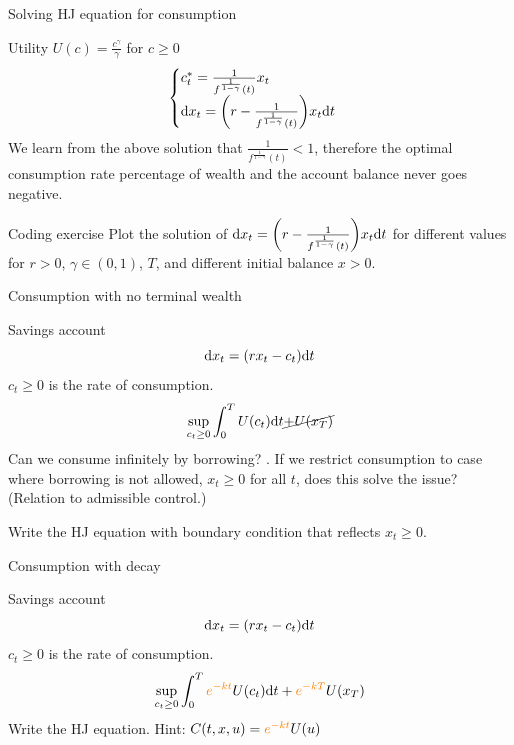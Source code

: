 \documentclass[color=usenames,dvipsnames]{beamer}
\newcommand{\dd}{\text{\normalfont d}}
\newcommand{\dt}{\text{\normalfont d}t}
\newcommand{\dx}{\text{\normalfont d}x}
\begin{document}
\begin{frame}{Solving HJ equation for consumption}
\begin{block}
    {Utility $U(c)=\frac{c^{\gamma}}{\gamma}$ for $c\ge0$} 
    \[
    \begin{cases}
       c^*_t=\frac{1}{f^{\frac{1}{1-\gamma}}(t)}x_t\\
       \dx_t = \bigg(r - \frac{1}{f^{\frac{1}{1-\gamma}}(t)}\bigg)x_t\dt
    \end{cases}
    \]
We learn from the above solution that $\frac{1}{f^{\frac{1}{1-\gamma}}(t)}<1$, therefore the optimal consumption rate percentage of wealth and the account balance never goes negative.
\end{block}

\begin{block}
    {Coding exercise}
    Plot the solution of 
    $\dx_t = \bigg(r - \frac{1}{f^{\frac{1}{1-\gamma}}(t)}\bigg)x_t\dt$
    for different values for $r>0$, $\gamma\in(0,1)$, $T$, and different initial balance $x>0.$
\end{block}

\end{frame}


\begin{frame}{Consumption with no terminal wealth}
    \begin{block}
        {Savings account}
        \[
        \dd{x}_t = (rx_t - c_t)\dt
        \]
        $c_t\ge0$ is the rate of consumption.
        \[
        \sup_{c_t\ge0} \int_0^T U(c_t)\dt \cancel{+ U(x_T)}
        \]
        Can we consume infinitely by borrowing? 
.
        If we restrict consumption to case where borrowing is not allowed, $x_t\ge0$ for all $t$, does this solve the issue? (Relation to admissible control.)

        Write the HJ equation with boundary condition that reflects $x_t\ge0$.
    \end{block}
\end{frame}


\begin{frame}{Consumption with decay}
    \begin{block}
        {Savings account}
        \[
        \dd{x}_t = (rx_t - c_t)\dt
        \]
        $c_t\ge0$ is the rate of consumption.
        \[
        \sup_{c_t\ge0} \int_0^T {\color{orange}e^{-kt}}U(c_t)\dt + {\color{orange}e^{-kT}}U(x_T)
        \]
        Write the HJ equation. Hint: $C(t,x,u)={\color{orange}e^{-kt}}U(u)$
    \end{block}
\end{frame}
\end{document}
